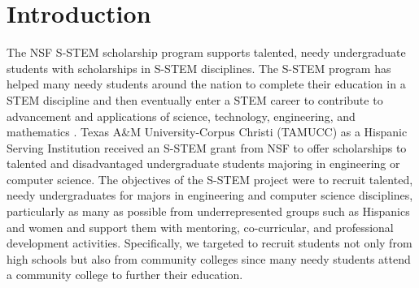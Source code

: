 \documentclass{article}
\begin{document}
\section{Introduction}
The NSF S-STEM scholarship program supports talented, needy undergraduate students with scholarships in S-STEM disciplines. The S-STEM program has helped many needy students around the nation to complete their education in a STEM discipline and then eventually enter a STEM career to contribute to advancement and applications of science, technology, engineering, and mathematics \cite{james, wilson, madsen, cutright, adams, gonzalez, russomanno2010memphistep, tinto2}. Texas A\&M University-Corpus Christi (TAMUCC) as a Hispanic Serving Institution received an S-STEM grant from NSF to offer scholarships to talented and disadvantaged undergraduate students majoring in engineering or computer science. The objectives of the S-STEM project were to recruit talented, needy undergraduates for majors in engineering and computer science disciplines, particularly as many as possible from underrepresented groups such as Hispanics and women and support them with mentoring, co-curricular, and professional development activities. Specifically, we targeted to recruit students not only from high schools but also from community colleges since many needy students attend a community college to further their education. 
\end{document}
